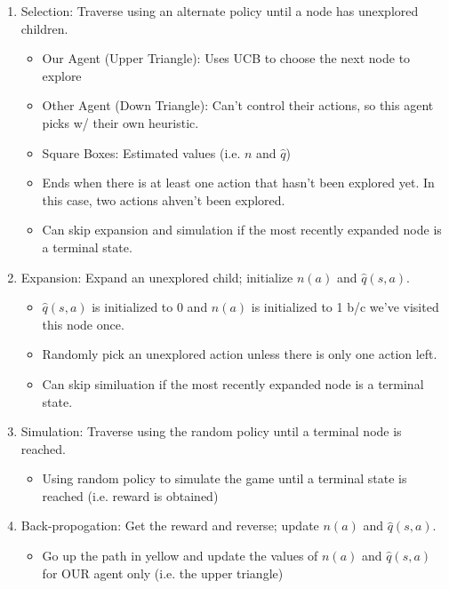 \begin{algo}
    \begin{enumerate}
        \item Selection: Traverse using an alternate policy until a node has unexplored children. 
        \begin{itemize}
            \item Our Agent (Upper Triangle): Uses UCB to choose the next node to explore
            \item Other Agent (Down Triangle): Can't control their actions, so this agent picks w/ their own heuristic.
            \item Square Boxes: Estimated values (i.e. $n$ and $\hat{q}$)
            \item Ends when there is at least one action that hasn't been explored yet. In this case, two actions ahven't been explored. 
            \item Can skip expansion and simulation if the most recently expanded node is a terminal state.
        \end{itemize}
        \item Expansion: Expand an unexplored child; initialize $n(a)$ and $\hat{q}(s,a)$.
        \begin{itemize}
            \item $\hat{q}(s,a)$ is initialized to 0 and $n(a)$ is initialized to 1 b/c we've visited this node once.
            \item Randomly pick an unexplored action unless there is only one action left.
            \item Can skip similuation if the most recently expanded node is a terminal state. 
        \end{itemize}
        \item Simulation: Traverse using the random policy until a terminal node is reached. 
        \begin{itemize}
            \item Using random policy to simulate the game until a terminal state is reached (i.e. reward is obtained)
        \end{itemize}
        \item Back-propogation: Get the reward and reverse; update $n(a)$ and $\hat{q}(s,a)$.
        \begin{itemize}
            \item Go up the path in yellow and update the values of $n(a)$ and $\hat{q}(s,a)$ for OUR agent only (i.e. the upper triangle)
        \end{itemize}
    \end{enumerate}
\end{algo}

